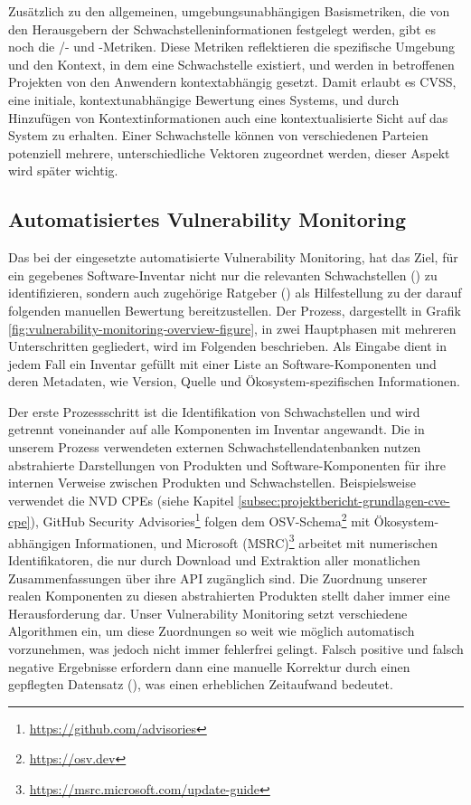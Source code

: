 Zusätzlich zu den allgemeinen, umgebungsunabhängigen Basismetriken, die von den Herausgebern der Schwachstelleninformationen festgelegt werden, gibt es noch die /- und -Metriken.
Diese Metriken reflektieren die spezifische Umgebung und den Kontext, in dem eine Schwachstelle existiert, und werden in betroffenen Projekten von den Anwendern kontextabhängig gesetzt.
Damit erlaubt es CVSS, eine initiale, kontextunabhängige Bewertung eines Systems, und durch Hinzufügen von Kontextinformationen auch eine kontextualisierte Sicht auf das System zu erhalten.
Einer Schwachstelle können von verschiedenen Parteien potenziell mehrere, unterschiedliche Vektoren zugeordnet werden, dieser Aspekt wird später wichtig.

\subsection{Automatisiertes Vulnerability Monitoring} \label{subsec:projektbericht-grundlagen-vulnerability-monitoring}

Das bei der {\metaeffekt} eingesetzte automatisierte Vulnerability Monitoring, hat das Ziel, für ein gegebenes Software-Inventar nicht nur die relevanten Schwachstellen () zu identifizieren, sondern auch zugehörige Ratgeber () als Hilfestellung zu der darauf folgenden manuellen Bewertung bereitzustellen.
Der Prozess, dargestellt in Grafik \ref{fig:vulnerability-monitoring-overview-figure}, in zwei Hauptphasen mit mehreren Unterschritten gegliedert, wird im Folgenden beschrieben.
Als Eingabe dient in jedem Fall ein Inventar gefüllt mit einer Liste an Software-Komponenten und deren Metadaten, wie Version, Quelle und Ökosystem-spezifischen Informationen.

Der erste Prozessschritt ist die Identifikation von Schwachstellen und wird getrennt voneinander auf alle Komponenten im Inventar angewandt.
Die in unserem Prozess verwendeten externen Schwachstellendatenbanken nutzen abstrahierte Darstellungen von Produkten und Software-Komponenten für ihre internen Verweise zwischen Produkten und Schwachstellen.
Beispielsweise verwendet die NVD CPEs (siehe Kapitel \ref{subsec:projektbericht-grundlagen-cve-cpe}), GitHub Security Advisories\footnote{\url{https://github.com/advisories}} folgen dem OSV-Schema\footnote{\url{https://osv.dev}} mit Ökosystem-abhängigen Informationen, und Microsoft (MSRC)\footnote{\url{https://msrc.microsoft.com/update-guide}} arbeitet mit numerischen Identifikatoren, die nur durch Download und Extraktion aller monatlichen Zusammenfassungen über ihre API zugänglich sind.
Die Zuordnung unserer realen Komponenten zu diesen abstrahierten Produkten stellt daher immer eine Herausforderung dar.
Unser Vulnerability Monitoring setzt verschiedene Algorithmen ein, um diese Zuordnungen so weit wie möglich automatisch vorzunehmen, was jedoch nicht immer fehlerfrei gelingt.
Falsch positive und falsch negative Ergebnisse erfordern dann eine manuelle Korrektur durch einen gepflegten Datensatz (), was einen erheblichen Zeitaufwand bedeutet.

